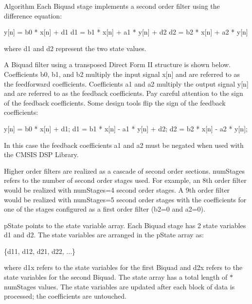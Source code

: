 \begin{DoxyParagraph}{Algorithm }
Each Biquad stage implements a second order filter using the difference equation\-: 
\begin{DoxyPre}       
   y[n] = b0 * x[n] + d1       
   d1 = b1 * x[n] + a1 * y[n] + d2       
   d2 = b2 * x[n] + a2 * y[n]       
\end{DoxyPre}
 where d1 and d2 represent the two state values.
\end{DoxyParagraph}
\begin{DoxyParagraph}{}
A Biquad filter using a transposed Direct Form I\-I structure is shown below.  Coefficients {\ttfamily b0, b1, and b2 } multiply the input signal {\ttfamily x\mbox{[}n\mbox{]}} and are referred to as the feedforward coefficients. Coefficients {\ttfamily a1} and {\ttfamily a2} multiply the output signal {\ttfamily y\mbox{[}n\mbox{]}} and are referred to as the feedback coefficients. Pay careful attention to the sign of the feedback coefficients. Some design tools flip the sign of the feedback coefficients\-: 
\begin{DoxyPre}       
   y[n] = b0 * x[n] + d1;       
   d1 = b1 * x[n] - a1 * y[n] + d2;       
   d2 = b2 * x[n] - a2 * y[n];       
\end{DoxyPre}
 In this case the feedback coefficients {\ttfamily a1} and {\ttfamily a2} must be negated when used with the C\-M\-S\-I\-S D\-S\-P Library.
\end{DoxyParagraph}
\begin{DoxyParagraph}{}
Higher order filters are realized as a cascade of second order sections. {\ttfamily num\-Stages} refers to the number of second order stages used. For example, an 8th order filter would be realized with {\ttfamily num\-Stages=4} second order stages. A 9th order filter would be realized with {\ttfamily num\-Stages=5} second order stages with the coefficients for one of the stages configured as a first order filter ({\ttfamily b2=0} and {\ttfamily a2=0}).
\end{DoxyParagraph}
\begin{DoxyParagraph}{}
{\ttfamily p\-State} points to the state variable array. Each Biquad stage has 2 state variables {\ttfamily d1} and {\ttfamily d2}. The state variables are arranged in the {\ttfamily p\-State} array as\-: 
\begin{DoxyPre}       
    \{d11, d12, d21, d22, ...\}       
\end{DoxyPre}
 where {\ttfamily d1x} refers to the state variables for the first Biquad and {\ttfamily d2x} refers to the state variables for the second Biquad. The state array has a total length of {$\ast$num\-Stages} values. The state variables are updated after each block of data is processed; the coefficients are untouched.
\end{DoxyParagraph}
